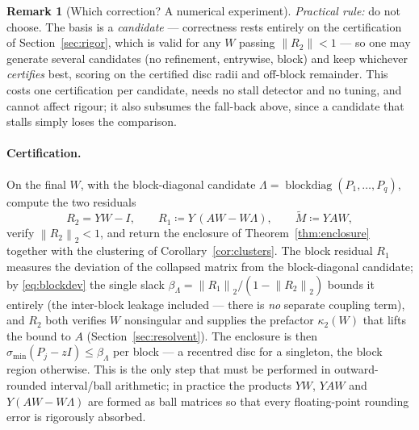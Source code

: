 \documentclass[11pt,a4paper]{article}
\newcommand{\norm}[1]{\left\|#1\right\|}
\theoremstyle{plain}
\theoremstyle{definition}
\newtheorem{remark}[theorem]{Remark}
\begin{document}
\begin{remark}[Which correction? A numerical experiment]
\emph{Practical rule:} do not choose. The basis is a \emph{candidate} --- correctness
rests entirely on the certification of Section~\ref{sec:rigor}, which is valid for any
$W$ passing $\norm{R_2}<1$ --- so one may generate several candidates (no refinement,
entrywise, block) and keep whichever \emph{certifies} best, scoring on the certified
disc radii and off-block remainder. This costs one certification per candidate, needs no
stall detector and no tuning, and cannot affect rigour; it also subsumes the fall-back
above, since a candidate that stalls simply loses the comparison.
\end{remark}

\paragraph{Certification.} On the final $W$, with the block-diagonal candidate
$\Lambda=\operatorname{blockdiag}(P_1,\dots,P_q)$, compute the two residuals
\begin{equation}\label{eq:Mtilde}
  R_2 = YW-I,\qquad R_1 \coloneqq Y\,(AW-W\Lambda),\qquad \widetilde M\coloneqq YAW ,
\end{equation}
verify $\norm{R_2}_2<1$, and return the enclosure of Theorem~\ref{thm:enclosure} together
with the clustering of Corollary~\ref{cor:clusters}. The block residual $R_1$ measures the
deviation of the collapsed matrix from the block-diagonal candidate; by \eqref{eq:blockdev}
the single slack $\beta_\Lambda=\norm{R_1}_2/(1-\norm{R_2}_2)$ bounds it entirely (the
inter-block leakage included --- there is \emph{no} separate coupling term), and $R_2$ both
verifies $W$ nonsingular and supplies the prefactor $\kappa_2(W)$ that lifts the bound to
$A$ (Section~\ref{sec:resolvent}). The enclosure is then $\sigma_{\min}(P_j-zI)\le\beta_\Lambda$
per block --- a recentred disc for a singleton, the block region otherwise. This is the only
step that must be performed in outward-rounded interval/ball arithmetic; in practice the
products $YW$, $YAW$ and $Y(AW-W\Lambda)$ are formed as ball matrices so that every
floating-point rounding error is rigorously absorbed.
\end{document}
